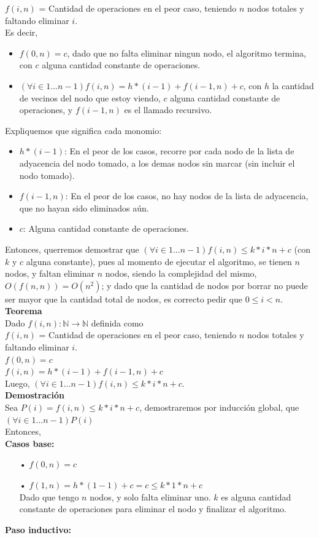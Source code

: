 $f(i,n)$ = Cantidad de operaciones en el peor caso, teniendo $n$ nodos totales y faltando eliminar $i$.\\
Es decir,\par
\begin{itemize}
	\item$f(0,n) = c$, dado que no falta eliminar ningun nodo, el algoritmo termina, con $c$ alguna cantidad constante de operaciones.\par
	\item $(\forall i \in {1...n-1}) f(i,n) = h*(i-1) + f(i-1,n) + c$, con $h$ la cantidad de vecinos del nodo que estoy viendo, $c$ alguna cantidad constante de operaciones, y $f(i-1,n)$ es el llamado recursivo.\\
\end{itemize}
Expliquemos que significa cada monomio:
\begin{itemize}
	\item $h*(i-1)$: En el peor de los casos, recorre por cada nodo de la lista de adyacencia del nodo tomado, a los demas nodos sin marcar (sin incluir el nodo tomado).
	\item $f(i-1,n)$: En el peor de los casos, no hay nodos de la lista de adyacencia, que no hayan sido eliminados aún.
	\item $c$: Alguna cantidad constante de operaciones.
\end{itemize}
Entonces, querremos demostrar que $(\forall i \in {1...n-1}) f(i,n) \leq k*i*n + c$ (con $k$ y $c$ alguna constante), pues al momento de ejecutar el algoritmo, se tienen $n$ nodos, y faltan eliminar $n$ nodos, siendo la complejidad del mismo, $O(f(n,n)) = O(n^{2})$; y dado que la cantidad de nodos por borrar no puede ser mayor que la cantidad total de nodos, es correcto pedir que $0 \leq i < n$.\\

\newpage
{\large\textbf{Teorema}}\\
Dado $f(i,n): \mathbb{N} \rightarrow \mathbb{N}$ definida como\\
$f(i,n)$ = Cantidad de operaciones  en el peor caso, teniendo $n$ nodos totales y faltando eliminar $i$.\\
$f(0,n) = c$\\
$f(i,n) = h*(i-1) + f(i-1,n) + c$\\
Luego, $(\forall i \in {1...n-1}) f(i,n) \leq k*i*n + c$.\\

{\large\textbf{Demostración}}\\
Sea $P(i) = f(i,n) \leq k*i*n + c$, demostraremos por inducción global, que $(\forall i \in {1...n-1}) P(i)$\\
Entonces,\\
\textbf{Casos base:}
\begin{itemize}
    \item[•] $f(0,n) = c$
    \item[•] $f(1,n) = h*(1-1) + c = c \leq k*1*n + c$\\
    Dado que tengo $n$ nodos, y solo falta eliminar uno. $k$ es alguna cantidad constante de operaciones para eliminar el nodo y finalizar el algoritmo.
\end{itemize}
\textbf{Paso inductivo:}\\

